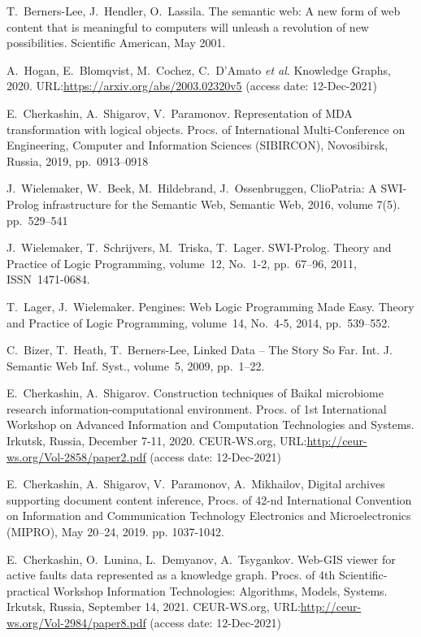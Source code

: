 \documentclass[
]{ceurart}
\begin{document}
\begin{thebibliography}{99}
 T.~Berners-Lee, J.~Hendler, O.~Lassila.  The semantic web: A new form of web content that is meaningful to computers will unleash a revolution of new possibilities.  Scientific American, May 2001.

 A.~Hogan, E.~Blomqvist, M.~Cochez, C.~D’Amato \emph{et al}. Knowledge Graphs, 2020. URL:\url{https://arxiv.org/abs/2003.02320v5} (access date: 12-Dec-2021)

 E.~Cherkashin, A.~Shigarov, V.~Paramonov. Representation of MDA transformation with logical objects.  Procs. of International Multi-Conference on Engineering, Computer and Information Sciences (SIBIRCON), Novosibirsk, Russia, 2019, pp.~0913--0918 

 J.~Wielemaker, W.~Beek, M.~Hildebrand, J.~Ossenbruggen, ClioPatria: A SWI-Prolog infrastructure for the Semantic Web, Semantic Web, 2016, volume 7(5). pp.~529--541 

 J.~Wielemaker, T.~Schrijvers, M.~Triska, T.~Lager. SWI-Prolog. Theory and Practice of Logic Programming, volume~12, No.~1-2, pp.~67--96, 2011, ISSN~1471-0684.

 T.~Lager, J.~Wielemaker. Pengines: Web Logic Programming Made Easy.  Theory and Practice of Logic Programming, volume~14, No.~4-5, 2014, pp.~539--552. 

 C.~Bizer, T.~Heath, T.~Berners-Lee, Linked Data -- The Story So Far.  Int. J. Semantic Web Inf. Syst., volume~5, 2009, pp.~1--22. 

 E.~Cherkashin, A.~Shigarov. Construction techniques of Baikal microbiome research information-computational environment.  Procs. of 1st International Workshop on Advanced Information and Computation Technologies and Systems. Irkutsk, Russia, December 7-11, 2020. CEUR-WS.org, URL:\url{http://ceur-ws.org/Vol-2858/paper2.pdf} (access date: 12-Dec-2021)

 E.~Cherkashin, A.~Shigarov, V.~Paramonov, A.~Mikhailov, Digital archives supporting document content inference, Procs.  of 42-nd International Convention on Information and Communication Technology Electronics and Microelectronics (MIPRO), May 20–24, 2019.  pp. 1037-1042. 

 E.~Cherkashin, O.~Lunina, L.~Demyanov, A.~Tsygankov. Web-GIS viewer for active faults data represented as a knowledge graph.  Procs. of 4th Scientific-practical Workshop Information Technologies: Algorithms, Models, Systems. Irkutsk, Russia, September 14, 2021. CEUR-WS.org, URL:\url{http://ceur-ws.org/Vol-2984/paper8.pdf} (access date: 12-Dec-2021)


\end{thebibliography}
\end{document}
